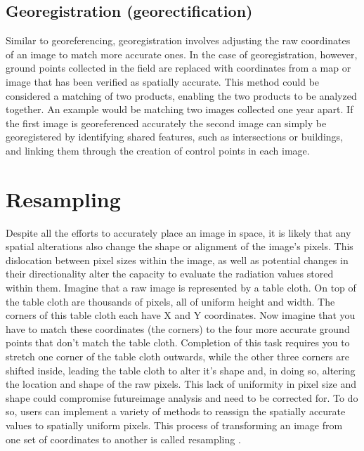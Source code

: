 \documentclass[
]{book}
\begin{document}
\subsection{Georegistration (georectification)}\label{georegistration-georectification}

Similar to georeferencing, georegistration involves adjusting the raw coordinates of an image to match more accurate ones. In the case of georegistration, however, ground points collected in the field are replaced with coordinates from a map or image that has been verified as spatially accurate. This method could be considered a matching of two products, enabling the two products to be analyzed together. An example would be matching two images collected one year apart. If the first image is georeferenced accurately the second image can simply be georegistered by identifying shared features, such as intersections or buildings, and linking them through the creation of control points in each image.

\section{Resampling}\label{resampling}

Despite all the efforts to accurately place an image in space, it is likely that any spatial alterations also change the shape or alignment of the image's pixels. This dislocation between pixel sizes within the image, as well as potential changes in their directionality alter the capacity to evaluate the radiation values stored within them. Imagine that a raw image is represented by a table cloth. On top of the table cloth are thousands of pixels, all of uniform height and width. The corners of this table cloth each have X and Y coordinates. Now imagine that you have to match these coordinates (the corners) to the four more accurate ground points that don't match the table cloth. Completion of this task requires you to stretch one corner of the table cloth outwards, while the other three corners are shifted inside, leading the table cloth to alter it's shape and, in doing so, altering the location and shape of the raw pixels. This lack of uniformity in pixel size and shape could compromise futureimage analysis and need to be corrected for. To do so, users can implement a variety of methods to reassign the spatially accurate values to spatially uniform pixels. This process of transforming an image from one set of coordinates to another is called resampling \citep{parker_comparison_1983}.
\end{document}
